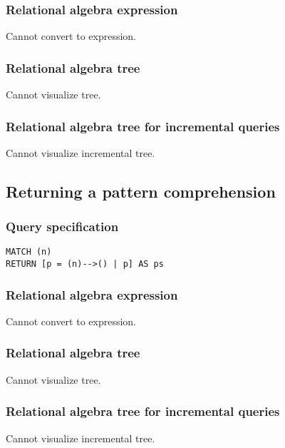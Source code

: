 \subsubsection*{Relational algebra expression}

Cannot convert to expression.

\subsubsection*{Relational algebra tree}

Cannot visualize tree.

\subsubsection*{Relational algebra tree for incremental queries}

Cannot visualize incremental tree.

\subsection{Returning a pattern comprehension}

\subsubsection*{Query specification}

\begin{lstlisting}
MATCH (n)
RETURN [p = (n)-->() | p] AS ps
\end{lstlisting}

\subsubsection*{Relational algebra expression}

Cannot convert to expression.

\subsubsection*{Relational algebra tree}

Cannot visualize tree.

\subsubsection*{Relational algebra tree for incremental queries}

Cannot visualize incremental tree.

